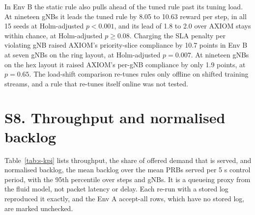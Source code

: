 \documentclass[9pt]{extarticle}
\begin{document}
In Env B the static rule also pulls ahead of the tuned rule past its tuning load. At nineteen gNBs it leads the tuned rule by 8.05 to 10.63 reward per step, in all 15 seeds at Holm-adjusted $p<0.001$, and its lead of 1.8 to 2.0 over AXIOM stays within chance, at Holm-adjusted $p\geq0.08$. Charging the SLA penalty per violating gNB raised AXIOM's priority-slice compliance by 10.7 points in Env B at seven gNBs on the ring layout, at Holm-adjusted $p=0.007$. At nineteen gNBs on the hex layout it raised AXIOM's per-gNB compliance by only 1.9 points, at $p=0.65$. The load-shift comparison re-tunes rules only offline on shifted training streams, and a rule that re-tunes itself online was not tested.

\section*{S8. Throughput and normalised backlog}
Table~\ref{tab:s-kpi} lists throughput, the share of offered demand that is served, and normalised backlog, the mean backlog over the mean PRBs served per 5 s control period, with the 95th percentile over steps and gNBs. It is a queueing proxy from the fluid model, not packet latency or delay. Each re-run with a stored log reproduced it exactly, and the Env A accept-all rows, which have no stored log, are marked unchecked.
\end{document}

